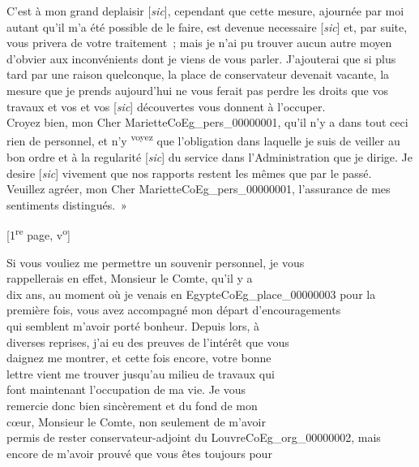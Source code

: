 \documentclass{book}
\begin{document}
{\indent C’est à mon grand deplaisir [\textit{sic}], cependant que cette mesure, ajournée par moi autant qu’il m’a été possible de le faire, est devenue necessaire [\textit{sic}] et, par suite, vous privera de votre traitement~; mais je n’ai pu trouver aucun autre moyen d’obvier aux inconvénients dont je viens de vous parler. J’ajouterai que si plus tard par une raison quelconque, la place de conservateur devenait vacante, la mesure que je prends aujourd’hui ne vous ferait pas perdre les droits que vos travaux et vos et vos [\textit{sic}] découvertes vous donnent à l’occuper.\\
\indent Croyez bien, mon Cher Mariette\gls{CoEg_pers_00000001}, qu’il n’y a dans tout ceci rien de personnel, et n’y \textsuperscript{voyez} que l’obligation dans laquelle je suis de veiller au bon ordre et à la regularité [\textit{sic}] du service dans l’Administration que je dirige. Je desire [\textit{sic}] vivement que nos rapports restent les mêmes que par le passé.\\
\indent Veuillez agréer, mon Cher Mariette\gls{CoEg_pers_00000001}, l’assurance de mes sentiments distingués.~»}
{\footnotesize \begin{center} [1\textsuperscript{re} page, v\textsuperscript{o}]\end{center}}
\indent Si vous vouliez me permettre un souvenir personnel, je vous\\
rappellerais en effet, Monsieur le Comte, qu’il y a\\
dix ans, au moment où je venais en Egypte\gls{CoEg_place_00000003} pour la\\
première fois, vous avez accompagné mon départ d’encouragements\\
qui semblent m’avoir porté bonheur. Depuis lors, à\\
diverses reprises, j’ai eu des preuves de l’intérêt que vous\\
daignez me montrer, et cette fois encore, votre bonne\\
lettre vient me trouver jusqu’au milieu de travaux qui\\
font maintenant l’occupation de ma vie. Je vous\\
remercie donc bien sincèrement et du fond de mon\\
cœur, Monsieur le Comte, non seulement de m’avoir\\
permis de rester conservateur-adjoint du Louvre\gls{CoEg_org_00000002}, mais\\
encore de m’avoir prouvé que vous êtes toujours pour\\
\end{document}
